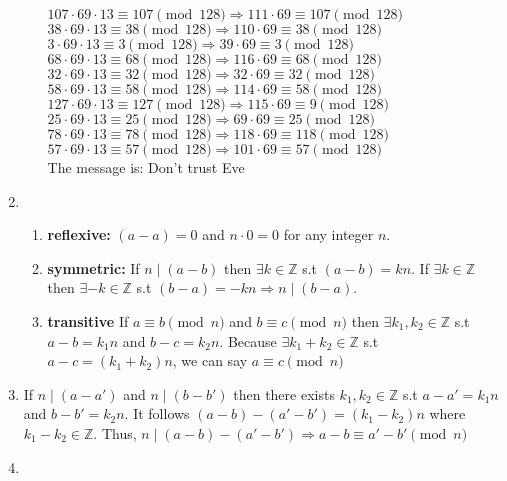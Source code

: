 \documentclass[10pt]{article}
\begin{document}
\begin{enumerate}[label=\arabic*.]
\begin{enumerate}
        $107\cdot69\cdot13\equiv 107\pmod{128}\Rightarrow 111\cdot 69\equiv 107\pmod{128}$\\
        $38\cdot69\cdot13\equiv 38\pmod{128}\Rightarrow 110\cdot 69\equiv 38\pmod{128}$\\
        $3\cdot69\cdot13\equiv 3\pmod{128}\Rightarrow 39\cdot 69\equiv 3\pmod{128}$\\
        $68\cdot69\cdot13\equiv 68\pmod{128}\Rightarrow 116\cdot 69\equiv 68\pmod{128}$\\
        $32\cdot69\cdot13\equiv 32\pmod{128}\Rightarrow 32\cdot 69\equiv 32\pmod{128}$\\
        $58\cdot69\cdot13\equiv 58\pmod{128}\Rightarrow 114\cdot 69\equiv 58\pmod{128}$\\
        $127\cdot69\cdot13\equiv 127\pmod{128}\Rightarrow 115\cdot 69\equiv 9\pmod{128}$\\
        $25\cdot69\cdot13\equiv 25\pmod{128}\Rightarrow 69\cdot 69\equiv 25\pmod{128}$\\
        $78\cdot69\cdot13\equiv 78\pmod{128}\Rightarrow 118\cdot 69\equiv 118\pmod{128}$\\
        $57\cdot69\cdot13\equiv 57\pmod{128}\Rightarrow 101\cdot 69\equiv 57\pmod{128}$\\
        The message is: Don't trust Eve
    \end{enumerate}
    \item \begin{enumerate}
        \item \textbf{reflexive:} $(a-a)=0$ and $n\cdot0=0$ for any integer $n$.
        \item \textbf{symmetric:} If $n\mid(a-b)$ then $\exists k\in\mathbb{Z}$ s.t $(a-b)=kn$. If $\exists k\in\mathbb{Z}$ then $\exists-k\in\mathbb{Z}$ s.t $(b-a)=-kn\Rightarrow n\mid (b-a)$.
        \item \textbf{transitive} If $a\equiv b\pmod{n}$ and $b\equiv c\pmod{n}$ then $\exists k_1,k_2\in\mathbb{Z}$ s.t $a-b=k_1n$ and $b-c=k_2n$. Because $\exists k_1+k_2\in\mathbb{Z}$ s.t $a-c=(k_1+k_2)n$, we can say $a\equiv c\pmod{n}$
    \end{enumerate}
    \item If $n\mid (a-a')$ and $n\mid (b-b')$ then there exists $k_1,k_2\in\mathbb{Z}$ s.t $a-a'=k_1n$ and $b-b'=k_2n$. 
    It follows $(a-b)-(a'-b')=(k_1-k_2)n$ where $k_1-k_2\in\mathbb{Z}$. 
    Thus, $n\mid (a-b)-(a'-b')\Rightarrow a-b\equiv a'-b'\pmod n$
    \item \begin{enumerate}

\end{enumerate}
\end{enumerate}
\end{document}
